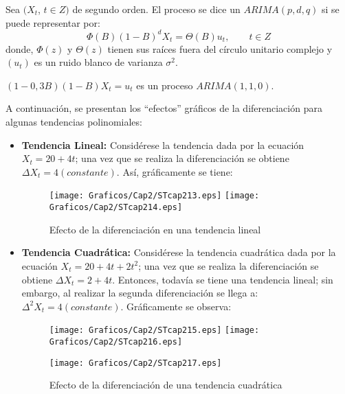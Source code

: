 \begin{definicion}
Sea $(X_{t}$, $t\in Z)$ de segundo orden. El proceso se dice un $ARIMA (p, d, q)$ si se puede representar por:
\begin{equation}
\label{eq3}
\Phi ( B ){(1-B)}^{d}X_{t}=\Theta( B )u_{t},\qquad t\in Z
\end{equation}
donde, $\Phi(z)$ y $\Theta(z)$ tienen sus ra\'{i}ces fuera del c\'{i}rculo unitario complejo y $(u_{t})$ es un ruido blanco de varianza $\sigma^{2}$. 
\end{definicion}

\begin{ejemplo}
 $\left( 1-0,3B \right)\left( 1-B \right)X_{t}=u_{t}$ es un proceso $ARIMA(1,1,0)$.\newline

A continuaci\'{o}n, se presentan los ``efectos'' gr\'{a}ficos de la diferenciaci\'{o}n para algunas tendencias polinomiales:

\begin{itemize}
\item \textbf{Tendencia Lineal:} Consid\'{e}rese la tendencia  dada por la ecuaci\'{o}n $X_{t}=20+4t$; una vez que se realiza la diferenciaci\'{o}n se obtiene ${\Delta }X_{t}=4 (constante)$. As\'{i}, gr\'{a}ficamente se tiene:
\begin{figure}[H]
\centering
\texttt{[image: Graficos/Cap2/STcap213.eps]}
\texttt{[image: Graficos/Cap2/STcap214.eps]}
\caption{Efecto de la diferenciaci\'{o}n en una tendencia lineal}
\end{figure}

\item \textbf{Tendencia Cuadr\'{a}tica:} Consid\'{e}rese la tendencia cuadr\'{a}tica dada por la ecuaci\'{o}n $X_{t}=20+4t+2t^{2}$; una vez que se realiza la diferenciaci\'{o}n se obtiene ${\Delta }X_{t}=2+4t$. Entonces, todav\'{i}a se tiene una tendencia lineal; sin embargo, al realizar la segunda diferenciaci\'{o}n se llega a: ${\Delta }^{2}X_{t}=4 (constante)$. Gr\'{a}ficamente se observa:

\begin{figure}[H]
\centering
\texttt{[image: Graficos/Cap2/STcap215.eps]}
\texttt{[image: Graficos/Cap2/STcap216.eps]}
\end{figure}

\begin{figure}[H]
\centering
\texttt{[image: Graficos/Cap2/STcap217.eps]}
\caption{Efecto de la diferenciaci\'{o}n de una tendencia cuadr\'{a}tica}
\end{figure}
\end{itemize}
\end{ejemplo}

